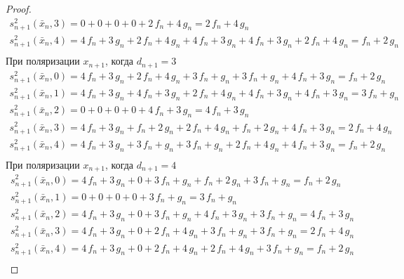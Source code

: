 \documentclass[bibliography=totoc, a4paper, 14pt]{extarticle}
\begin{document}
\begin{proof}
$$\begin{array}{l}
s_{n+1}^2(\bar{x}_n, 3) = 0 + 0 + 0 + 0 + 2\,f_n + 4\,g_n = 2\,f_n + 4\,g_n \\
s_{n+1}^2(\bar{x}_n, 4) = 4\,f_n + 3\,g_n + 2\,f_n + 4\,g_n + 4\,f_n + 3\,g_n + 4\,f_n + 3\,g_n + 2\,f_n + 4\,g_n = f_n + 2\,g_n \\
\end{array}$$
При поляризации $x_{n+1}$, когда $d_{n+1} = 3$
$$\begin{array}{l}
s_{n+1}^2(\bar{x}_n, 0) = 4\,f_n + 3\,g_n + 2\,f_n + 4\,g_n + 3\,f_n + g_n + 3\,f_n + g_n + 4\,f_n + 3\,g_n = f_n + 2\,g_n \\
s_{n+1}^2(\bar{x}_n, 1) = 4\,f_n + 3\,g_n + 4\,f_n + 3\,g_n + 2\,f_n + 4\,g_n + 4\,f_n + 3\,g_n + 4\,f_n + 3\,g_n = 3\,f_n + g_n \\
s_{n+1}^2(\bar{x}_n, 2) = 0 + 0 + 0 + 0 + 4\,f_n + 3\,g_n = 4\,f_n + 3\,g_n \\
s_{n+1}^2(\bar{x}_n, 3) = 4\,f_n + 3\,g_n + f_n + 2\,g_n + 2\,f_n + 4\,g_n + f_n + 2\,g_n + 4\,f_n + 3\,g_n = 2\,f_n + 4\,g_n \\
s_{n+1}^2(\bar{x}_n, 4) = 4\,f_n + 3\,g_n + 3\,f_n + g_n + 3\,f_n + g_n + 2\,f_n + 4\,g_n + 4\,f_n + 3\,g_n = f_n + 2\,g_n \\
\end{array}$$
При поляризации $x_{n+1}$, когда $d_{n+1} = 4$
$$\begin{array}{l}
s_{n+1}^2(\bar{x}_n, 0) = 4\,f_n + 3\,g_n + 0 + 3\,f_n + g_n + f_n + 2\,g_n + 3\,f_n + g_n = f_n + 2\,g_n \\
s_{n+1}^2(\bar{x}_n, 1) = 0 + 0 + 0 + 0 + 3\,f_n + g_n = 3\,f_n + g_n \\
s_{n+1}^2(\bar{x}_n, 2) = 4\,f_n + 3\,g_n + 0 + 3\,f_n + g_n + 4\,f_n + 3\,g_n + 3\,f_n + g_n = 4\,f_n + 3\,g_n \\
s_{n+1}^2(\bar{x}_n, 3) = 4\,f_n + 3\,g_n + 0 + 2\,f_n + 4\,g_n + 3\,f_n + g_n + 3\,f_n + g_n = 2\,f_n + 4\,g_n \\
s_{n+1}^2(\bar{x}_n, 4) = 4\,f_n + 3\,g_n + 0 + 2\,f_n + 4\,g_n + 2\,f_n + 4\,g_n + 3\,f_n + g_n = f_n + 2\,g_n \\
\end{array}$$

\end{proof}
\end{document}
